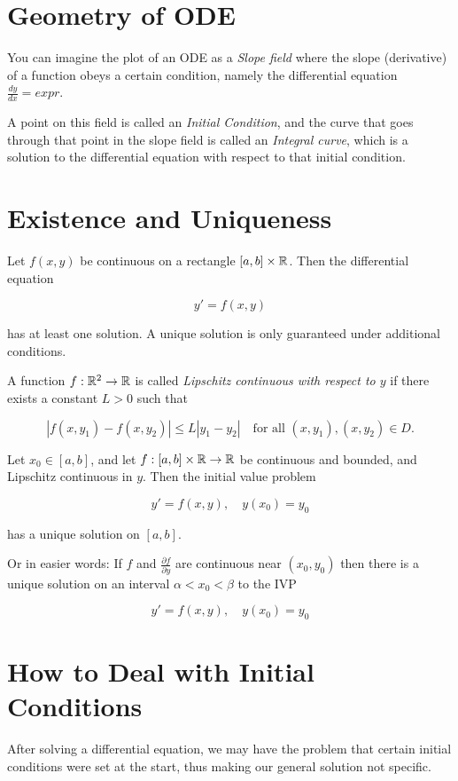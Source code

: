 \section{Geometry of ODE}

You can imagine the plot of an ODE as a \emph{Slope field} where the slope (derivative) of a function
obeys a certain condition, namely the differential equation \(\frac{dy}{dx} = expr\).

A point on this field is called an \emph{Initial Condition}, and the curve that goes through
that point in the slope field is called an \emph{Integral curve}, which is a solution to the differential
equation with respect to that initial condition.

\section{Existence and Uniqueness}

Let \( f(x, y) \) be continuous on a rectangle \( [a, b] \times \mathbb{R} \). Then the differential
equation

\[
    y' = f(x, y)
\]

has at least one solution. A unique solution is only guaranteed under additional conditions.

A function \( f : \mathbb{R}^2 \to \mathbb{R} \) is called
\emph{Lipschitz continuous with respect to \(y\)} if there exists a constant \( L > 0 \) such that

\[
    |f(x, y_1) - f(x, y_2)| \leq L |y_1 - y_2|
    \quad \text{for all } (x, y_1), (x, y_2) \in D.
\]

Let \( x_0 \in [a, b] \), and let \( f : [a, b] \times \mathbb{R} \to \mathbb{R} \) be continuous
and bounded, and Lipschitz continuous in \(y\). Then the initial value problem

\[
    y' = f(x, y), \quad y(x_0) = y_0
\]

has a unique solution on \( [a, b] \).

Or in easier words: If \(f\) and \(\frac{\partial f}{\partial y}\) are continuous near \((x_0, y_0)\)
then there is a unique solution on an interval \(\alpha < x_0 < \beta\) to the IVP

\[
    y' = f(x,y), \quad y(x_0) = y_0
\]

\section{How to Deal with Initial Conditions}

After solving a differential equation, we may have the problem that certain initial
conditions were set at the start, thus making our general solution not specific.

